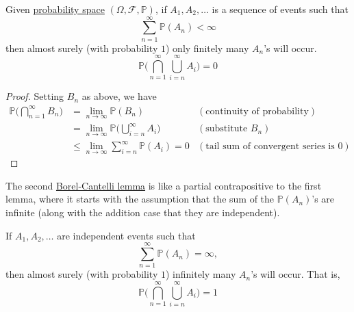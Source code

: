   \begin{lemma}
    \label{thm:1st-borel-cantelli-lemma}
    Given \hyperref[def:probability-space]{probability space} $(\Omega, \mathcal{F}, \mathbb{P})$, if $A_1, A_2, \ldots$ is a sequence of events such that 
    \begin{equation}
      \sum_{n=1}^\infty \mathbb{P}(A_n) < \infty
    \end{equation}
    then almost surely (with probability $1$) only finitely many $A_n$'s will occur. 
    \begin{equation}
      \mathbb{P} \bigg( \bigcap_{n=1}^\infty \bigcup_{i = n}^\infty A_i \bigg) = 0
    \end{equation}
  \end{lemma}
  \begin{proof}
    Setting $B_n$ as above, we have 
    \begin{align*}
      \mathbb{P}\bigg( \bigcap_{n=1}^\infty B_n \bigg) & = \lim_{n \rightarrow \infty} \mathbb{P}(B_n) & (\text{continuity of probability}) \\
      & = \lim_{n \rightarrow \infty} \mathbb{P} \bigg( \bigcup_{i=n}^\infty A_i \bigg) & (\text{substitute } B_n) \\
      & \leq \lim_{n \rightarrow \infty} \sum_{i = n}^\infty \mathbb{P}(A_i) = 0 & (\text{tail sum of convergent series is } 0)
    \end{align*}
  \end{proof}

  The second \hyperref[mt-thm:borel-cantelli-lemma]{Borel-Cantelli lemma} is like a partial contrapositive to the first lemma, where it starts with the assumption that the sum of the $\mathbb{P}(A_n)$'s are infinite (along with the addition case that they are independent). 

  \begin{lemma}
    \label{thm:2nd-borel-cantelli-lemma}
    If $A_1, A_2, \ldots$ are independent events such that 
    \begin{equation}
      \sum_{n=1}^\infty \mathbb{P}(A_n) = \infty,
    \end{equation}
    then almost surely (with probability $1$) infinitely many $A_n$'s will occur. That is, 
    \begin{equation}
      \mathbb{P} \bigg( \bigcap_{n=1}^\infty \bigcup_{i = n}^\infty A_i \bigg) = 1
    \end{equation}
  \end{lemma}

